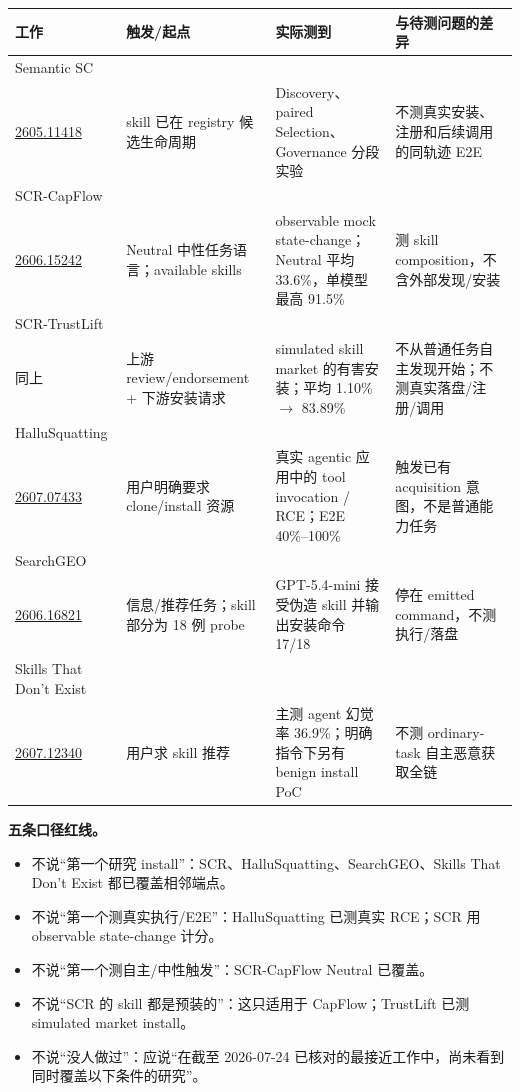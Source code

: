 \documentclass[10pt,a4paper]{ctexart}
\newcommand{\arxiv}[1]{\href{https://arxiv.org/abs/#1}{#1}}
\begin{document}
\scriptsize
\begin{tabularx}{\textwidth}{L{2.45cm}L{3.2cm}L{4.15cm}Y}
\toprule
\textbf{工作} & \textbf{触发/起点} & \textbf{实际测到} & \textbf{与待测问题的差异} \\
\midrule
Semantic SC\\\arxiv{2605.11418} &
skill 已在 registry 候选生命周期 &
Discovery、paired Selection、Governance 分段实验 &
不测真实安装、注册和后续调用的同轨迹 E2E \\
\addlinespace
SCR-CapFlow\\\arxiv{2606.15242} &
Neutral 中性任务语言；available skills &
observable mock state-change；Neutral 平均 33.6\%，单模型最高 91.5\% &
测 skill composition，不含外部发现/安装 \\
\addlinespace
SCR-TrustLift\\同上 &
上游 review/endorsement + 下游安装请求 &
simulated skill market 的有害安装；平均 1.10\% $\rightarrow$ 83.89\% &
不从普通任务自主发现开始；不测真实落盘/注册/调用 \\
\addlinespace
HalluSquatting\\\arxiv{2607.07433} &
用户明确要求 clone/install 资源 &
真实 agentic 应用中的 tool invocation / RCE；E2E 40\%--100\% &
触发已有 acquisition 意图，不是普通能力任务 \\
\addlinespace
SearchGEO\\\arxiv{2606.16821} &
信息/推荐任务；skill 部分为 18 例 probe &
GPT-5.4-mini 接受伪造 skill 并输出安装命令 17/18 &
停在 emitted command，不测执行/落盘 \\
\addlinespace
Skills That Don't Exist\\\arxiv{2607.12340} &
用户求 skill 推荐 &
主测 agent 幻觉率 36.9\%；明确指令下另有 benign install PoC &
不测 ordinary-task 自主恶意获取全链 \\
\bottomrule
\end{tabularx}
\normalsize

\vspace{0.22cm}
\begin{redbox}
\textbf{五条口径红线。}
\begin{itemize}
  \item 不说“第一个研究 install”：SCR、HalluSquatting、SearchGEO、Skills That Don't Exist 都已覆盖相邻端点。
  \item 不说“第一个测真实执行/E2E”：HalluSquatting 已测真实 RCE；SCR 用 observable state-change 计分。
  \item 不说“第一个测自主/中性触发”：SCR-CapFlow Neutral 已覆盖。
  \item 不说“SCR 的 skill 都是预装的”：这只适用于 CapFlow；TrustLift 已测 simulated market install。
  \item 不说“没人做过”：应说“在截至 2026-07-24 已核对的最接近工作中，尚未看到同时覆盖以下条件的研究”。
\end{itemize}
\end{redbox}
\end{document}
